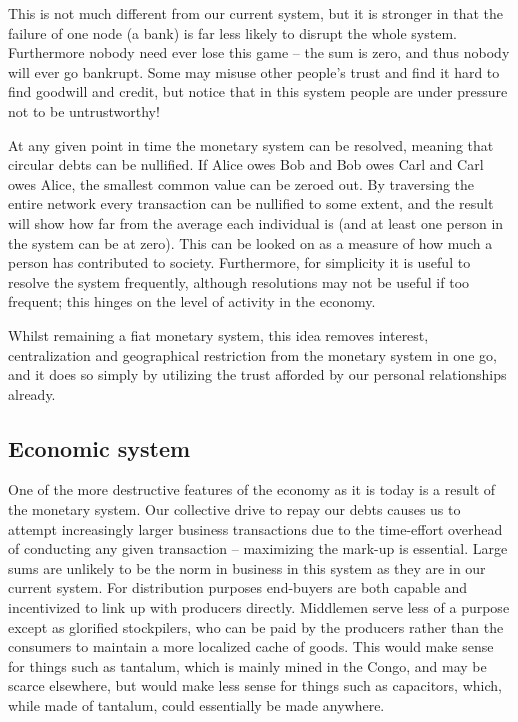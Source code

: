 This is not much dif\hbox{}ferent from our current system, but it is stronger 
in that the failure of one node (a bank) is far less likely to disrupt the 
whole system.  Furthermore nobody need ever lose this game – the sum is zero,
and thus nobody will ever go bankrupt. Some may misuse other people's trust and
f\hbox{}ind it hard to f\hbox{}ind goodwill and credit, but notice that in this
system people are under pressure not to be untrustworthy!

At any given point in time the monetary system can be resolved, meaning that
circular debts can be nullif\hbox{}ied. If Alice owes Bob and Bob owes Carl and
Carl owes Alice, the smallest common value can be zeroed out. By traversing the
entire network every transaction can be nullif\hbox{}ied to some extent, and 
the result will show how far from the average each individual is (and at least
one person in the system can be at zero). This can be looked on as a measure of
how much a person has contributed to society. Furthermore, for simplicity it is
useful to resolve the system frequently, although resolutions may not be useful
if too frequent; this hinges on the level of activity in the economy.

Whilst remaining a f\hbox{}iat monetary system, this idea removes interest,
centralization and geographical restriction from the monetary system in one go,
and it does so simply by utilizing the trust af\hbox{}forded by our personal
relationships already.


\subsection{Economic system}
\label{s:artificial_scarcity:five_steps:economic_system}

One of the more destructive features of the economy as it is today is a result
of the monetary system. Our collective drive to repay our debts causes us to
attempt increasingly larger business transactions due to the time-ef\hbox{}fort
overhead of conducting any given transaction – maximizing the mark-up is
essential. Large sums are unlikely to be the norm in business in this system as
they are in our current system. For distribution purposes end-buyers are both
capable and incentivized to link up with producers directly. Middlemen serve
less of a purpose except as glorif\hbox{}ied stockpilers, who can be paid by 
the producers rather than the consumers to maintain a more localized cache of
goods. This would make sense for things such as tantalum, which is mainly mined
in the Congo, and may be scarce elsewhere, but would make less sense for things
such as capacitors, which, while made of tantalum, could essentially be made
anywhere.

